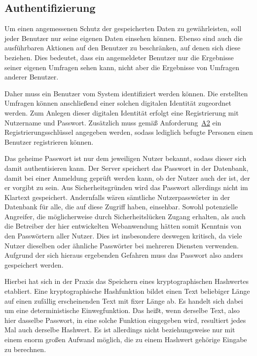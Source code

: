 \subsection{Authentifizierung}
\label{sec:authentifizierung}

Um einen angemessenen Schutz der gespeicherten Daten zu gewährleisten, soll jeder Benutzer nur seine eigenen Daten einsehen können.
Ebenso sind auch die ausführbaren Aktionen auf den Benutzer zu beschränken, auf denen sich diese beziehen.
Dies bedeutet, dass ein angemeldeter Benutzer nur die Ergebnisse seiner eigenen Umfragen sehen kann, nicht aber die Ergebnisse von Umfragen anderer Benutzer.

Daher muss ein Benutzer vom System identifiziert werden können.
Die erstellten Umfragen können anschließend einer solchen digitalen Identität zugeordnet werden.
Zum Anlegen dieser digitalen Identität erfolgt eine Registrierung mit Nutzername und Passwort.
Zusätzlich muss gemäß Anforderung~\hyperref[Anf:A2]{A2} ein Registrierungsschlüssel angegeben werden, sodass lediglich befugte Personen einen Benutzer registrieren können.

Das geheime Passwort ist nur dem jeweiligen Nutzer bekannt, sodass dieser sich damit authentisieren kann.
Der Server speichert das Passwort in der Datenbank, damit bei einer Anmeldung geprüft werden kann, ob der Nutzer auch der ist, der er vorgibt zu sein.
Aus Sicherheitsgründen wird das Passwort allerdings nicht im Klartext gespeichert.
Andernfalls wären sämtliche Nutzerpasswörter in der Datenbank für alle, die auf diese Zugriff haben, einsehbar.
Sowohl potenzielle Angreifer, die möglicherweise durch Sicherheitslücken Zugang erhalten, als auch die Betreiber der hier entwickelten Webanwendung hätten somit Kenntnis von den Passwörtern aller Nutzer.
Dies ist insbesondere deswegen kritisch, da viele Nutzer dieselben oder ähnliche Passwörter bei mehreren Diensten verwenden.
Aufgrund der sich hieraus ergebenden Gefahren muss das Passwort also anders gespeichert werden.

Hierbei hat sich in der Praxis das Speichern eines kryptographischen Hashwertes etabliert.
Eine kryptographische Hashfunktion bildet einen Text beliebiger Länge auf einen zufällig erscheinenden Text mit fixer Länge ab.
Es handelt sich dabei um eine deterministische Einwegfunktion.
Das heißt, wenn derselbe Text, also hier dasselbe Passwort, in eine solche Funktion eingegeben wird, resultiert jedes Mal auch derselbe Hashwert.
Es ist allerdings nicht beziehungsweise nur mit einem enorm großen Aufwand möglich, die zu einem Hashwert gehörige Eingabe zu berechnen.

